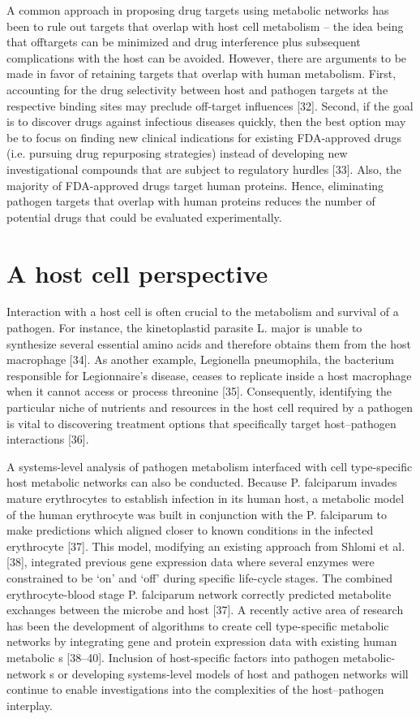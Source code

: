 A common approach in proposing drug targets using metabolic 
networks has been to rule out targets that overlap with host 
cell metabolism – the idea being that offtargets can be minimized 
and drug interference plus subsequent complications with the host 
can be avoided. However, there are arguments to be made in favor 
of retaining targets that overlap with human metabolism. First, 
accounting for the drug selectivity between host and pathogen 
targets at the respective binding sites may preclude off-target 
influences [32]. Second, if the goal is to discover drugs against 
infectious diseases quickly, then the best option may be to 
focus on finding new clinical indications for existing FDA-approved 
drugs (i.e. pursuing drug repurposing strategies) instead of 
developing new investigational compounds that are subject to 
regulatory hurdles [33]. Also, the majority of FDA-approved 
drugs target human proteins. Hence, eliminating pathogen 
targets that overlap with human proteins reduces the number 
of potential drugs that could be evaluated experimentally.

\section{A host cell perspective}
Interaction with a host cell is often crucial to the metabolism 
and survival of a pathogen. For instance, the kinetoplastid 
parasite L. major is unable to synthesize several essential 
amino acids and therefore obtains them from the host macrophage [34]. 
As another example, Legionella pneumophila, the bacterium 
responsible for Legionnaire’s disease, ceases to replicate 
inside a host macrophage when it cannot access or process 
threonine [35]. Consequently, identifying the particular 
niche of nutrients and resources in the host cell required 
by a pathogen is vital to discovering treatment options 
that specifically target host–pathogen interactions [36].

A systems-level analysis of pathogen metabolism interfaced 
with cell type-specific host metabolic networks can also 
be conducted. Because P. falciparum invades mature erythrocytes 
to establish infection in its human host, a metabolic model 
of the human erythrocyte was built in conjunction with the 
P. falciparum  to make predictions which aligned 
closer to known conditions in the infected erythrocyte [37]. 
This model, modifying an existing approach from Shlomi et al. [38], 
integrated previous gene expression data where several enzymes 
were constrained to be ‘on’ and ‘off’ during specific life-cycle 
stages. The combined erythrocyte-blood stage P. falciparum 
network correctly predicted metabolite exchanges between the 
microbe and host [37]. A recently active area of research has 
been the development of algorithms to create cell type-specific 
metabolic networks by integrating gene and protein expression 
data with existing human metabolic s [38–40]. Inclusion 
of host-specific factors into pathogen metabolic-network 
s or developing systems-level models of host and 
pathogen networks will continue to enable investigations into 
the complexities of the host–pathogen interplay.

